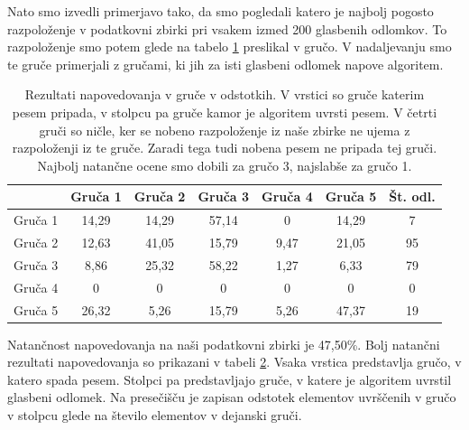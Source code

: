 \documentclass[a4paper, 12pt]{book}
\begin{document}
{\begin{table}[htb]
\begin{center}
\begin{tabular}{|l|c|}
\hline
\end{tabular}
\label{gruce_nase}
\end{center}
\end{table}

Nato smo izvedli primerjavo tako, da smo pogledali katero je najbolj pogosto razpoloženje v podatkovni zbirki pri vsakem izmed 200 glasbenih odlomkov. To razpoloženje smo potem glede na tabelo \ref{gruce_nase} preslikal v gručo. V nadaljevanju smo te gruče primerjali z gručami, ki jih za isti glasbeni odlomek napove algoritem. 

\begin{table}[htb]
\begin{center}
\caption{Rezultati napovedovanja v gruče v odstotkih. V vrstici so gruče katerim pesem pripada, v stolpcu pa gruče kamor je algoritem uvrsti pesem. V četrti gruči so ničle, ker se nobeno razpoloženje iz naše zbirke ne ujema z razpoloženji iz te gruče. Zaradi tega tudi nobena pesem ne pripada tej gruči. Najbolj natančne ocene smo dobili za gručo 3, najslabše za gručo 1.}
\begin{tabular}{|l|c|c|c|c|c|c|}
\hline
 & Gruča 1 & Gruča 2 & Gruča 3 & Gruča 4 & Gruča 5 & Št. odl.\\ \hline
Gruča 1 & 14,29 & 14,29	& 57,14 & 0 & 14,29 & 7\\ \hline
Gruča 2 & 12,63 & 41,05 & 15,79 & 9,47 & 21,05 & 95\\ \hline
Gruča 3 & 8,86 & 25,32 & 58,22 & 1,27 & 6,33 & 79\\ \hline
Gruča 4 & 0	& 0 & 0 & 0 & 0 & 0\\ \hline
Gruča 5 & 26,32	& 5,26	& 15,79 & 5,26 & 47,37 & 19 \\ \hline

\hline
\end{tabular}
\label{natancnost_gruce_nasa}
\end{center}
\end{table}

Natančnost napovedovanja na naši podatkovni zbirki je 47,50\%. Bolj natančni rezultati napovedovanja so prikazani v tabeli \ref{natancnost_gruce_nasa}. Vsaka vrstica predstavlja gručo, v katero spada pesem. Stolpci pa predstavljajo gruče, v katere je algoritem uvrstil glasbeni odlomek. Na presečišču je zapisan odstotek elementov uvrščenih v gručo v stolpcu glede na število elementov v dejanski gruči. 

}
\end{document}
